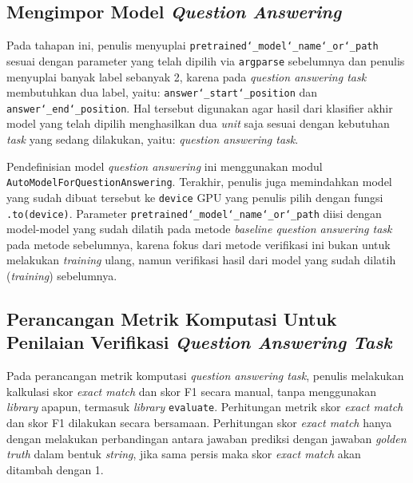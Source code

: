 \subsection{Mengimpor Model \emph{Question Answering}}
Pada tahapan ini, penulis menyuplai \texttt{pretrained\char`_model\char`_name\char`_or\char`_path} sesuai dengan parameter yang telah dipilih via \texttt{argparse} sebelumnya dan penulis menyuplai banyak label sebanyak 2, karena pada \emph{question answering task} membutuhkan dua label, yaitu: \texttt{answer\char`_start\char`_position} dan \texttt{answer\char`_end\char`_position}. Hal tersebut digunakan agar hasil dari klasifier akhir model yang telah dipilih menghasilkan dua \emph{unit} saja sesuai dengan kebutuhan \emph{task} yang sedang dilakukan, yaitu: \emph{question answering task}. 

Pendefinisian model \emph{question answering} ini menggunakan modul \texttt{AutoModelForQuestionAnswering}. Terakhir, penulis juga memindahkan model yang sudah dibuat tersebut ke \texttt{device} GPU yang penulis pilih dengan fungsi \texttt{.to(device)}. Parameter \texttt{pretrained\char`_model\char`_name\char`_or\char`_path} diisi dengan model-model yang sudah dilatih pada metode \emph{baseline question answering task} pada metode sebelumnya, karena fokus dari metode verifikasi ini bukan untuk melakukan \emph{training} ulang, namun verifikasi hasil dari model yang sudah dilatih (\emph{training}) sebelumnya.

\subsection{Perancangan Metrik Komputasi Untuk Penilaian Verifikasi \emph{Question Answering Task}}
Pada perancangan metrik komputasi \emph{question answering task}, penulis melakukan kalkulasi skor \emph{exact match} dan skor F1 secara manual, tanpa menggunakan \emph{library} apapun, termasuk \emph{library} \texttt{evaluate}. Perhitungan metrik skor \emph{exact match} dan skor F1 dilakukan secara bersamaan. Perhitungan skor \emph{exact match} hanya dengan melakukan perbandingan antara jawaban prediksi dengan jawaban \emph{golden truth} dalam bentuk \emph{string}, jika sama persis maka skor \emph{exact match} akan ditambah dengan 1. 

